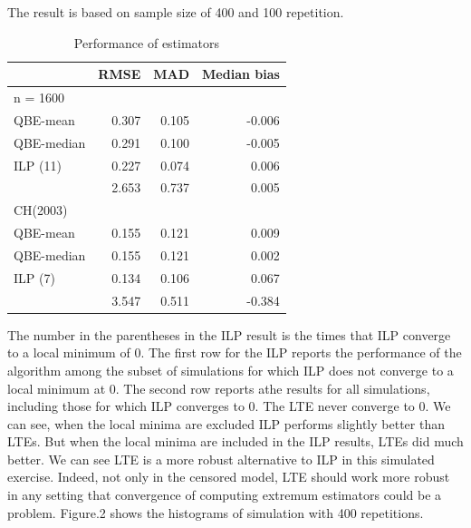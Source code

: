 \documentclass[12pt]{article}
\theoremstyle{plain} \newtheorem{theorem}{Theorem}
\theoremstyle{definition} \newtheorem{definition}{Definition}
\begin{document}
The result is based on sample size of 400 and 100 repetition.

\begin{table}[h]
    \centering
    \begin{tabular}{lrrr}
      \hline
      & RMSE   & MAD  & Median bias \\ \hline
      n = 1600   &       &       &  \\
      QBE-mean   & 0.307 & 0.105 & -0.006     \\
      QBE-median & 0.291 & 0.100 & -0.005    \\
      ILP (11)   & 0.227 & 0.074 &  0.006    \\
      & 2.653 & 0.737 &  0.005    \\
      \hline
      CH(2003)   &       &       &  \\
      QBE-mean   & 0.155 & 0.121 &  0.009    \\
      QBE-median & 0.155 & 0.121 &  0.002    \\
      ILP (7)    & 0.134 & 0.106 &  0.067    \\
      & 3.547 & 0.511 & -0.384    \\
      \hline
    \end{tabular}
    \caption{Performance of estimators}
\end{table}

The number in the parentheses in the ILP result is the times that ILP
converge to a local minimum of 0. The first row for the ILP reports
the performance of the algorithm among the subset of simulations for
which ILP does not converge to a local minimum at 0. The second row
reports athe results for all simulations, including those for which
ILP converges to 0. The LTE never converge to 0. We can see, when the
local minima are excluded ILP performs slightly better than LTEs. But
when the local minima are included in the ILP results, LTEs did much
better. We can see LTE is a more robust alternative to ILP in this simulated exercise. Indeed, not only
in the censored model, LTE should work more robust in any setting that convergence of computing
extremum estimators could be a problem. Figure.2 shows the
histograms of simulation with 400 repetitions.
\end{document}
